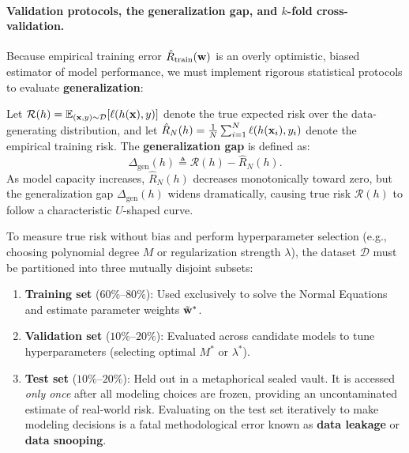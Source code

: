 \paragraph{Validation protocols, the generalization gap, and $k$-fold cross-validation.}
\label{sec:validation_protocols_crossval}

Because empirical training error $\hat{R}_{\text{train}}(\mathbf{w})$ is an overly optimistic, biased estimator of model performance, we must implement rigorous statistical protocols to evaluate \textbf{generalization}:

\begin{definition}
Let $\mathcal{R}(h) = \mathbb{E}_{(\mathbf{x}, y)\sim \mathcal{D}}[\ell(h(\mathbf{x}), y)]$ denote the true expected risk over the data-generating distribution, and let $\hat{R}_N(h) = \frac{1}{N}\sum_{i=1}^N \ell(h(\mathbf{x}_i), y_i)$ denote the empirical training risk. The \textbf{generalization gap} is defined as:
\begin{equation}
\Delta_{\text{gen}}(h) \triangleq \mathcal{R}(h) - \hat{R}_N(h).
\label{eq:generalization_gap_def}
\end{equation}
As model capacity increases, $\hat{R}_N(h)$ decreases monotonically toward zero, but the generalization gap $\Delta_{\text{gen}}(h)$ widens dramatically, causing true risk $\mathcal{R}(h)$ to follow a characteristic $U$-shaped curve.
\end{definition}

To measure true risk without bias and perform hyperparameter selection (e.g., choosing polynomial degree $M$ or regularization strength $\lambda$), the dataset $\mathcal{D}$ must be partitioned into three mutually disjoint subsets:
\begin{enumerate}[noitemsep,topsep=2pt,parsep=0pt,partopsep=0pt]
  \item \textbf{Training set} ($60\%$--$80\%$): Used exclusively to solve the Normal Equations and estimate parameter weights $\tilde{\mathbf{w}}^*$.
  \item \textbf{Validation set} ($10\%$--$20\%$): Evaluated across candidate models to tune hyperparameters (selecting optimal $M^*$ or $\lambda^*$).
  \item \textbf{Test set} ($10\%$--$20\%$): Held out in a metaphorical sealed vault. It is accessed \textit{only once} after all modeling choices are frozen, providing an uncontaminated estimate of real-world risk. Evaluating on the test set iteratively to make modeling decisions is a fatal methodological error known as \textbf{data leakage} or \textbf{data snooping}.
\end{enumerate}

